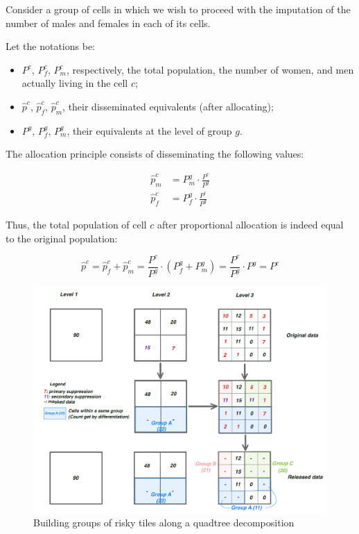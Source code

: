 Consider a group of cells in which we wish to proceed with the imputation of the number of males and females in each of its cells.

Let the notations be:
   \begin{itemize}
    \item $P^c$, $P^c_f$, $P^c_m$, respectively, the total population, the number of women, and men actually living in the cell $c$;
    \item $\hat{p}^c$, $\hat{p}^c_f$, $\hat{p}^c_m$, their disseminated equivalents (after allocating);
    \item $P^g$, $P^g_f$, $P^g_m$, their equivalents at the level of group $g$.
\end{itemize}

The allocation principle consists of disseminating the following values:

\begin{equation}
\begin{split}
    \hat{p}^c_m &= P^g_m \cdot \frac{P^c}{P^g} \\
    \hat{p}^c_f &= P^g_f \cdot \frac{P^c}{P^g}    
\end{split}    
\end{equation}

Thus, the total population of cell $c$ after proportional allocation is indeed equal to the original population:

\begin{equation}
    \hat{p}^c = \hat{p}^c_f + \hat{p}^c_m = \frac{P^c}{P^g} \cdot (P^g_f + P^g_m) 
    = \frac{P^c}{P^g} \cdot P^g 
    = P^c
\end{equation}

\begin{figure}[H]
    \centering
    \includegraphics[width=\textwidth]{figures/Quadtree/grille_creu_proc_all.png}
    \caption{Building groups of risky tiles along a quadtree decomposition}
    \label{fig:multilayer_grid}
\end{figure}

